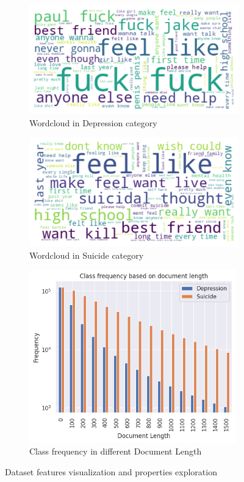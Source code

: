 \documentclass[sn-mathphys,Numbered]{sn-jnl}%
\theoremstyle{thmstyleone}%
\theoremstyle{thmstyletwo}%
\theoremstyle{thmstylethree}%
\begin{document}
\begin{figure}[H]
\centering
\begin{subfigure}{0.45\textwidth}
    \includegraphics[width=\textwidth]{dep_wordcloud.png}
    \caption{Wordcloud in Depression category}
    \label{fig:first}
\end{subfigure}
\hfill
\begin{subfigure}{0.45\textwidth}
    \includegraphics[width=\textwidth]{sui_wordcloud.png}
    \caption{Wordcloud in Suicide category}
    \label{fig:second}
\end{subfigure}
\hfill
\begin{subfigure}{0.8\textwidth}
    \includegraphics[height=7.5cm, width=\textwidth]{doc_len.png}
    \caption{Class frequency in different Document Length}
    \label{fig:second}
\end{subfigure}        
\caption{Dataset features visualization and properties exploration}
\label{features_vis_pro_exp}
\end{figure}
\end{document}
